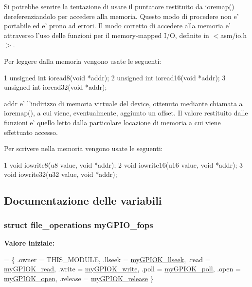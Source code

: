 Si potrebbe senrire la tentazione di usare il puntatore restituito da ioremap() dereferenziandolo per accedere alla memoria. Questo modo di procedere non e' portabile ed e' prono ad errori. Il modo corretto di accedere alla memoria e' attraverso l'uso delle funzioni per il memory-\/mapped I/\+O, definite in $<$asm/io.\+h$>$.

Per leggere dalla memoria vengono usate le seguenti\+:


\begin{DoxyCode}
1 unsigned int ioread8(void *addr);
2 unsigned int ioread16(void *addr);
3 unsigned int ioread32(void *addr);
\end{DoxyCode}


addr e' l'indirizzo di memoria virtuale del device, ottenuto mediante chiamata a ioremap(), a cui viene, eventualmente, aggiunto un offset. Il valore restituito dalle funzioni e' quello letto dalla particolare locazione di memoria a cui viene effettuato accesso.

Per scrivere nella memoria vengono usate le seguenti\+:


\begin{DoxyCode}
1 void iowrite8(u8 value, void *addr);
2 void iowrite16(u16 value, void *addr);
3 void iowrite32(u32 value, void *addr);
\end{DoxyCode}


\subsection{Documentazione delle variabili}
\hypertarget{group___linux-_driver_ga9f31111fdb3b4a5944e18d45045e0f01}{
\subsubsection[{my\+G\+P\+I\+O\+\_\+fops}]{\setlength{\rightskip}{0pt plus 5cm}struct file\+\_\+operations my\+G\+P\+I\+O\+\_\+fops\hspace{0.3cm}{\ttfamily [static]}}}\label{group___linux-_driver_ga9f31111fdb3b4a5944e18d45045e0f01}
{\bfseries Valore iniziale\+:}
\begin{DoxyCode}
= \{
        .owner      = THIS\_MODULE,
        .llseek     = \hyperlink{group___linux-_driver_ga66e7f726b72320a272b633ecbaecefff}{myGPIOK\_llseek},
        .read       = \hyperlink{group___linux-_driver_ga90ac339df9c02ae5f11a2a7727adc923}{myGPIOK\_read},
        .write      = \hyperlink{group___linux-_driver_ga1eea0f6c86e8966ba9b701da57502aad}{myGPIOK\_write},
        .poll       = \hyperlink{group___linux-_driver_gaba935e8a8215c2ebce9a7147fd4f5147}{myGPIOK\_poll},
        .open       = \hyperlink{group___linux-_driver_gad013759c18fbf6ea96005b9b3bfa5b4e}{myGPIOK\_open},
        .release    = \hyperlink{group___linux-_driver_ga17ce7f574723246c790b70b06e3e7103}{myGPIOK\_release}
\}
\end{DoxyCode}


